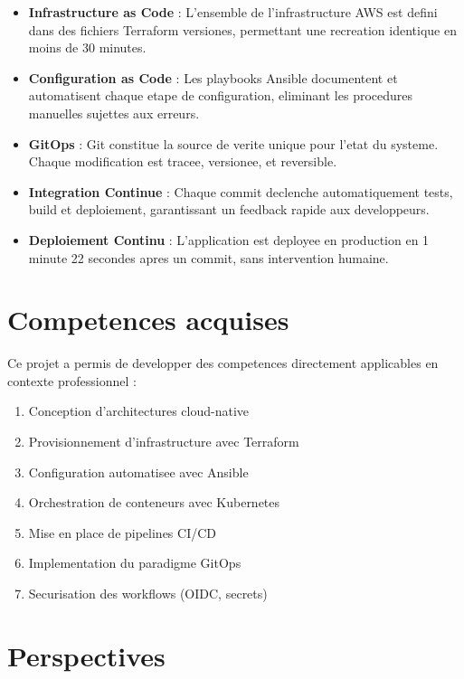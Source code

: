\documentclass[12pt,a4paper,french]{report}
\begin{document}
\begin{itemize}
    \item \textbf{Infrastructure as Code} : L'ensemble de l'infrastructure AWS est defini dans des fichiers Terraform versiones, permettant une recreation identique en moins de 30 minutes.

    \item \textbf{Configuration as Code} : Les playbooks Ansible documentent et automatisent chaque etape de configuration, eliminant les procedures manuelles sujettes aux erreurs.

    \item \textbf{GitOps} : Git constitue la source de verite unique pour l'etat du systeme. Chaque modification est tracee, versionee, et reversible.

    \item \textbf{Integration Continue} : Chaque commit declenche automatiquement tests, build et deploiement, garantissant un feedback rapide aux developpeurs.

    \item \textbf{Deploiement Continu} : L'application est deployee en production en 1 minute 22 secondes apres un commit, sans intervention humaine.
\end{itemize}

\section{Competences acquises}

Ce projet a permis de developper des competences directement applicables en contexte professionnel :

\begin{enumerate}
    \item Conception d'architectures cloud-native
    \item Provisionnement d'infrastructure avec Terraform
    \item Configuration automatisee avec Ansible
    \item Orchestration de conteneurs avec Kubernetes
    \item Mise en place de pipelines CI/CD
    \item Implementation du paradigme GitOps
    \item Securisation des workflows (OIDC, secrets)
\end{enumerate}

\section{Perspectives}
\end{document}
